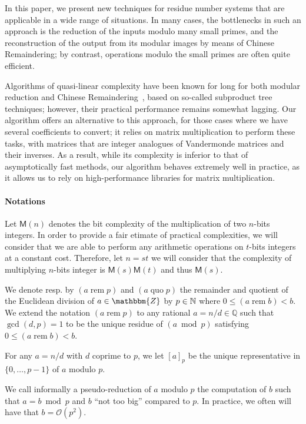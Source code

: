 \documentclass[acmtoms,acmnow]{acmtrans2m}
\def\M{\mathsf{M}} \def\I{\mathsf{I}} \def\R{\mathsf{R}} \def\Q{\mathbb{Q}}
\def\bigO{{\ensuremath{\mathcal{O}}}}
\newcommand{\tmop}[1]{\ensuremath{\operatorname{#1}}}
\newcommand{\rem}{\tmop{rem}}
\begin{document}
In this paper, we present new techniques for residue number systems that are applicable in a wide
range of situations. In many cases, the bottlenecks in such an approach is the reduction of the
inputs modulo many small primes, and the reconstruction of the output from its modular images by
means of Chinese Remaindering; by contrast, operations modulo the small primes are often quite
efficient.

Algorithms of quasi-linear complexity have been known for long for both modular reduction and
Chinese Remaindering~\cite[Chapter~10]{GaGe13}, based on so-called subproduct tree techniques;
however, their practical performance remains somewhat lagging. Our algorithm offers an alternative
to this approach, for those cases where we have several coefficients to convert; it relies on
matrix multiplication to perform these tasks, with matrices that are integer analogues of
Vandermonde matrices and their inverses. As a result, while its complexity is inferior to that of
asymptotically fast methods, our algorithm behaves extremely well in practice, as it allows us to
rely on high-performance libraries for matrix multiplication.

\paragraph{Notations}

Let $\M (n)$ denotes the bit complexity of the multiplication of two $n$-bits integers.
In order to provide a fair etimate of practical complexities, we will consider that we are able to
perform any arithmetic operations on $t$-bits integers at a constant cost. Therefore, let $n=st$ we will consider that the complexity of multiplying $n$-bits integer is $\M(s)\M(t)$ and thus $\M(s)$.

We denote resp. by $(a \rem p)$ and $(a \tmop{quo} p)$ the
remainder and quotient of the Euclidean division of $a \in \mathbbm{Z}$ by
$p \in \mathbb{N}$ where $0 \leqslant (a \rem b) < b$.  We extend the
notation $(a \rem p)$ to any rational $a=n/d \in \Q$ such that
$\gcd (d,p) = 1$ to be the unique residue of $(a \bmod p)$ satisfying
$0 \leqslant (a \rem b) < b$.

For any $a = n / d$ with $d$ coprime to $p$, we let $[a]_p$ be the
unique representative in $\{ 0, \ldots, p - 1 \}$ of $a$ modulo $p$.

We call informally a pseudo-reduction of $a$ modulo $p$ the computation
of $b$ such that $a = b \bmod p$ and $b$ ``not too big'' compared to $p$. In
practice, we often will have that $b =\bigO (p^2)$.
\end{document}

